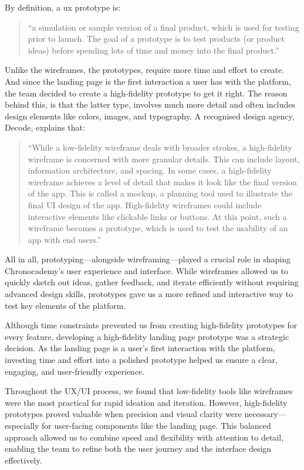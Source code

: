 By definition, a ux prototype is:
\begin{quote}
    ``a simulation or sample version of a final product, which is used for
    testing prior to launch.
    The goal of a prototype is to test products (or
    product ideas) before spending lots of time and money into the final
    product.''\cite[UX Deliverables]{uxDeliverables}
\end{quote}

Unlike the wireframes, the prototypes, require more time and effort to create.
And since the landing page is the first interaction a user has with the platform, the team decided to create a high-fidelity prototype to get it right.
The reason behind this, is that the latter type, involves much more detail and often includes design elements like colors, images, and typography.
A recognised design agency, Decode, explains that:
\begin{quote}
    ``While a low-fidelity wireframe deals with broader strokes, a high-fidelity wireframe is concerned with more granular details.
This can include layout, information architecture, and spacing.
In some cases, a high-fidelity wireframe achieves a level of detail that makes it look like the final version of the app.
This is called a mockup, a planning tool used to illustrate the final UI design of the app.
High-fidelity wireframes could include interactive elements like clickable links or buttons.
At this point, such a wireframe becomes a prototype, which is used to test the usability of an app with end users.''\cite[Low-fidelity vs High-fidelity]{lowFidelity}
\end{quote}

All in all, prototyping—alongside wireframing—played a crucial role in shaping Chronocademy’s user experience and interface.
While wireframes allowed us to quickly sketch out ideas, gather feedback, and iterate efficiently without requiring advanced design skills, prototypes gave us a more refined and interactive way to test key elements of the platform.

Although time constraints prevented us from creating high-fidelity prototypes for every feature, developing a high-fidelity landing page prototype was a strategic decision.
As the landing page is a user's first interaction with the platform, investing time and effort into a polished prototype helped us ensure a clear, engaging, and user-friendly experience.

Throughout the UX/UI process, we found that low-fidelity tools like wireframes were the most practical for rapid ideation and iteration.
However, high-fidelity prototypes proved valuable when precision and visual clarity were necessary—especially for user-facing components like the landing page.
This balanced approach allowed us to combine speed and flexibility with attention to detail, enabling the team to refine both the user journey and the interface design effectively.

